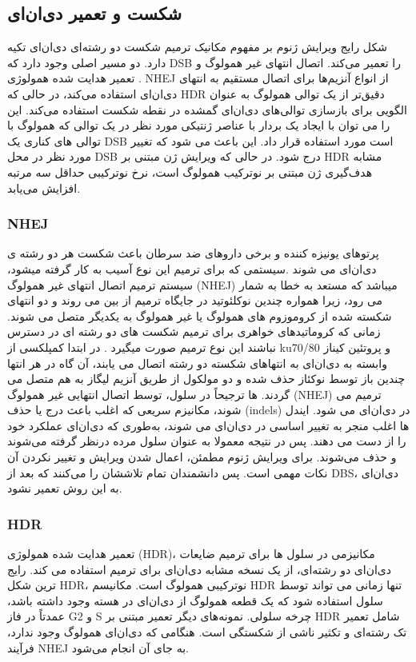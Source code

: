 \documentclass[12pt,a4paper,BCOR=.7cm,headsepline,bibliography=totoc]{report}
\begin{document}
\subsection{ شکست و تعمیر دی‌ان‌ای}
شکل رایج ویرایش ژنوم بر مفهوم مکانیک ترمیم شکست دو رشته‌ای دی‌ان‌ای
تکیه دارد. دو مسیر اصلی وجود دارد که DSB را تعمیر می‌کند. اتصال انتهای غیر همولوگ
  و تعمیر هدایت شده همولوژی
   . NHEJ از انواع آنزیم‌ها برای اتصال مستقیم به انتهای دی‌ان‌ای استفاده می‌کند، در حالی که HDR دقیق‌تر از یک توالی همولوگ به عنوان الگویی برای بازسازی توالی‌های دی‌ان‌ای گمشده در نقطه شکست استفاده می‌کند. این را می توان با ایجاد یک بردار با عناصر ژنتیکی مورد نظر در یک توالی که همولوگ با توالی های کناری یک DSB است مورد استفاده قرار داد. این باعث می شود که تغییر مورد نظر در محل DSB درج شود. در حالی که ویرایش ژن مبتنی بر HDR مشابه هدف‌گیری ژن مبتنی بر نوترکیب همولوگ است، نرخ نوترکیبی حداقل سه مرتبه افزایش می‌یابد.
\subsubsection{NHEJ}

پرتوهای یونیزه کننده و برخی داروهای ضد سرطان باعث شکست هر دو رشته ی دی‌ان‌ای می شوند .سیستمی که برای ترمیم این نوع آسیب به کار گرفته میشود، سیستم ترمیم اتصال انتهای غیر همولوگ (NHEJ) میباشد که مستعد به خطا به شمار می رود، زیرا همواره چندین نوکلئوتید در جایگاه ترمیم از بین می روند و دو انتهای شکسته شده از کروموزوم های همولوگ یا غیر همولوگ به یکدیگر متصل می شوند.
زمانی که کروماتیدهای خواهری برای ترمیم شکست های دو رشته ای در دسترس نباشند این نوع ترمیم صورت میگیرد . در ابتدا کمپلکسی از ku70/80 و پروتئین کیناز وابسته به دی‌ان‌ای به انتهاهای شکسته دو رشته اتصال می یابند، آن گاه در هر انتها چندین باز توسط نوکئاز حذف شده و دو مولکول از طریق آنزیم لیگاز به هم متصل می گردند. 
ها
 ترجیحاً در سلول، توسط اتصال انتهایی غیر همولوگ (NHEJ) ترمیم می شوند، مکانیزم سریعی که اغلب باعث درج یا حذف (indels) در دی‌ان‌ای می شود. ایندل ها اغلب منجر به تغییر اساسی در دی‌ان‌ای می شوند، به‌طوری که دی‌ان‌ای عملکرد خود را از دست می دهند. پس در نتیجه معمولا به عنوان سلول مرده درنظر گرفته می‌شوند و حذف می‌شوند. برای ویرایش ژنوم مطمئن، اعمال شدن ویرایش و تغییر نکردن آن نکات مهمی است. پس دانشمندان تمام تلاششان را می‌کنند که بعد از DBS، دی‌ان‌ای به این روش تعمیر نشود.
\subsubsection{HDR}
 تعمیر هدایت شده همولوژی (HDR)، مکانیزمی در سلول ها برای ترمیم ضایعات دی‌ان‌ای دو رشته‌ای، از یک نسخه مشابه دی‌ان‌ای برای ترمیم استفاده می کند. رایج ترین شکل HDR، نوترکیبی همولوگ است. مکانیسم HDR تنها زمانی می تواند توسط سلول استفاده شود که یک قطعه همولوگ از دی‌ان‌ای در هسته وجود داشته باشد، عمدتاً در فاز G2 و S چرخه سلولی. نمونه‌های دیگر تعمیر مبتنی بر HDR شامل تعمیر تک رشته‌ای و تکثیر ناشی از شکستگی است. هنگامی که دی‌ان‌ای همولوگ وجود ندارد، فرآیند NHEJ به جای آن انجام می‌شود.
\end{document}
